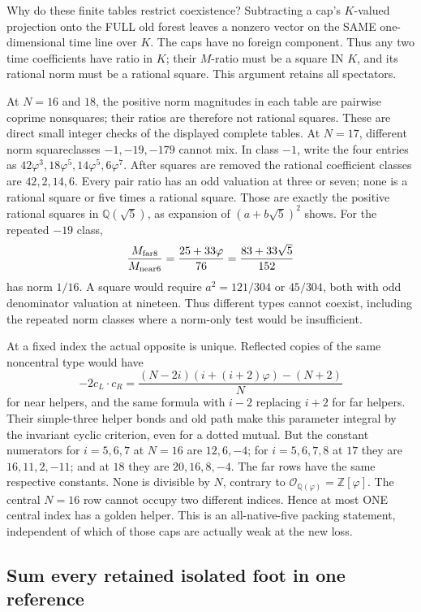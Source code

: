 \documentclass[11pt]{article}
\begin{document}
Why do these finite tables restrict coexistence?
Subtracting a cap's \(K\)-valued projection onto the FULL old
forest leaves a nonzero vector on the SAME one-dimensional
time line over \(K\).
The caps have no foreign component.
Thus any two time coefficients have ratio in \(K\);
their \(M\)-ratio must be a square IN \(K\), and its rational
norm must be a rational square.
This argument retains all spectators.

At \(N=16\) and \(18\), the positive norm magnitudes in each
table are pairwise coprime nonsquares; their ratios are therefore
not rational squares.  These are direct small integer checks of
the displayed complete tables.
At \(N=17\), different norm squareclasses \(-1,-19,-179\)
cannot mix.
In class \(-1\), write the four entries as
\(42\varphi^3,18\varphi^5,14\varphi^5,6\varphi^7\).
After squares are removed the rational coefficient classes are
\(42,2,14,6\).
Every pair ratio has an odd valuation at three or seven;
none is a rational square or five times a rational square.
Those are exactly the positive rational squares in
\(\mathbb Q(\sqrt5)\), as expansion of
\((a+b\sqrt5)^2\) shows.
For the repeated \(-19\) class,
\[
 {\frac{M_{\rm far8}}{M_{\rm near6}}}
   ={\frac{25+33\varphi}{76}}={\frac{83+33\sqrt5}{152}}
\]
has norm \(1/16\).
A square would require
\(a^2=121/304\) or \(45/304\), both with odd denominator
valuation at nineteen.
Thus different types cannot coexist, including the repeated
norm classes where a norm-only test would be insufficient.

At a fixed index the actual opposite is unique.
Reflected copies of the same noncentral type would have
\[
 -2c_L\cdot c_R=
 {\frac{(N-2i)(i+(i+2)\varphi)-(N+2)}{N}}
\]
for near helpers, and the same formula with \(i-2\) replacing
\(i+2\) for far helpers.
Their simple-three helper bonds and old path make this
parameter integral by the invariant cyclic criterion, even for
a dotted mutual.
But the constant numerators for \(i=5,6,7\) at \(N=16\) are
\(12,6,-4\); for \(i=5,6,7,8\) at \(17\) they are
\(16,11,2,-11\); and at \(18\) they are \(20,16,8,-4\).
The far rows have the same respective constants.
None is divisible by \(N\), contrary to
\(\mathcal O_{\mathbb Q(\varphi)}=\mathbb Z[\varphi]\).
The central \(N=16\) row cannot occupy two different indices.
Hence at most ONE central index has a golden helper.
This is an all-native-five packing statement, independent of
which of those caps are actually weak at the new loss.

\subsection{Sum every retained isolated foot in one reference}
\label{app:arithsummedfeet}
\end{document}
